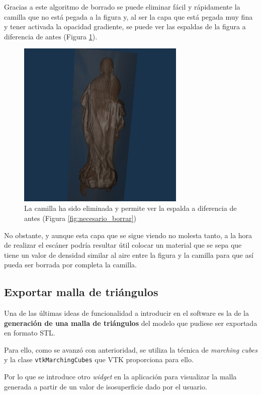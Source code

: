 Gracias a este algoritmo de borrado se puede eliminar fácil y rápidamente la camilla que no está pegada a la figura y, al ser la capa que está pegada muy fina y tener activada la opacidad gradiente, se puede ver las espaldas de la figura a diferencia de antes (Figura \ref{fig:camilla_borrada}).

\begin{figure}[H]
	\centering
	\includegraphics[width=8cm]{imagenes/camilla_borrada}
	\caption{La camilla ha sido eliminada y permite ver la espalda a diferencia de antes (Figura \ref{fig:necesario_borrar})}
	\label{fig:camilla_borrada}
\end{figure}

No obstante, y aunque esta capa que se sigue viendo no molesta tanto, a la hora de realizar el escáner podría resultar útil colocar un material que se sepa que tiene un valor de densidad similar al aire entre la figura y la camilla para que así pueda ser borrada por completa la camilla.

\subsection{Exportar malla de triángulos}

Una de las últimas ideas de funcionalidad a introducir en el software es la de la \textbf{generación de una malla de triángulos} del modelo que pudiese ser exportada en formato STL.

Para ello, como se avanzó con anterioridad, se utiliza la técnica de \textit{marching cubes} y la clase \texttt{vtkMarchingCubes} que VTK proporciona para ello.

Por lo que se introduce otro \textit{widget} en la aplicación para visualizar la malla generada a partir de un valor de isosuperficie dado por el usuario.

